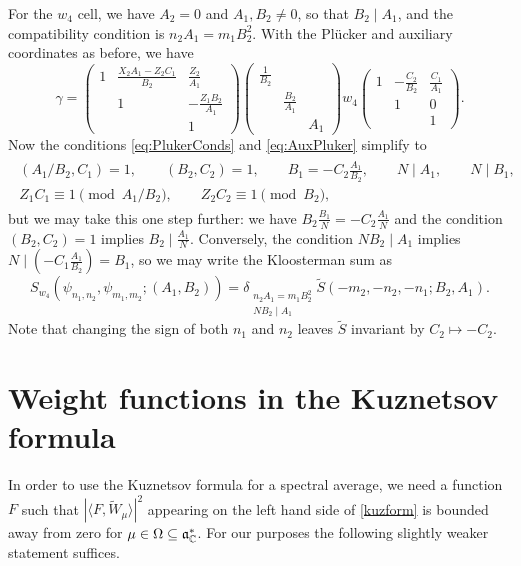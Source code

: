 \documentclass[11pt]{amsart}
\theoremstyle{plain}
\numberwithin{equation}{section}
\theoremstyle{definition}
\begin{document}
For the $w_4$ cell, we have $A_2=0$ and $A_1,B_2\ne 0$, so that $B_2\mid A_1$, and the compatibility condition is $n_2 A_1=m_1 B_2^2$.
With the Pl\"ucker and auxiliary coordinates as before, we have
\[ \gamma = \left(\begin{matrix}1&\frac{X_2 A_1-Z_2 C_1}{B_2}&\frac{Z_2}{A_1} \\&1&-\frac{Z_1 B_2}{A_1}\\&&1\end{matrix}\right) \left(\begin{matrix}\frac{1}{B_2}\\&\frac{B_2}{A_1}\\&&A_1\end{matrix}\right) w_4 \left(\begin{matrix}1&-\frac{C_2}{B_2}&\frac{C_1}{A_1} \\&1&0\\&&1\end{matrix}\right). \]
Now the conditions \eqref{eq:PlukerConds} and \eqref{eq:AuxPluker} simplify to
\begin{align*}
\begin{array}{l}
	(A_1/B_2,C_1)=1, \qquad (B_2,C_2)=1, \qquad B_1 = -C_2 \frac{A_1}{B_2}, \qquad N\mid A_1, \qquad N\mid B_1, \\
	Z_1 C_1 \equiv 1 \pmod{A_1/B_2}, \qquad Z_2 C_2 \equiv 1 \pmod{B_2},
\end{array}
\end{align*}
but we may take this one step further: 
we have $B_2\frac{B_1}{N} = -C_2 \frac{A_1}{N}$ and the condition $(B_2,C_2)=1$ implies $B_2 \mid  \frac{A_1}{N}$.
Conversely, the condition $N B_2 \mid  A_1$ implies $N \mid  (-C_1 \frac{A_1}{B_2})=B_1$, so we may write the Kloosterman sum as
\[ S_{w_4}(\psi_{n_1,n_2},\psi_{m_1,m_2};(A_1,B_2)) = \delta_{\substack{n_2 A_1=m_1 B_2^2 \\ N B_2\mid A_1}} \tilde{S}(-m_2,-n_2,-n_1;B_2,A_1). \] 
Note that changing the sign of both $n_1$ and $n_2$ leaves $\tilde{S}$ invariant by $C_2 \mapsto -C_2$.
 
  
\section{Weight functions in the Kuznetsov formula}

In order to  use the Kuznetsov formula for a spectral average, we need a function $F$ such that $|\langle F, \tilde{W}_{\mu}\rangle|^2$ appearing on the left hand side of \eqref{kuzform} is bounded away from zero for $\mu \in \Omega \subseteq \mathfrak{a}_{\Bbb{C}}^{\ast}$. For our purposes the following slightly weaker statement suffices.
\end{document}
